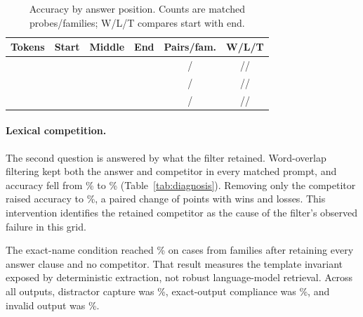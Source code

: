 \documentclass{article}
\begin{document}
\begin{table}[t]
\caption{Accuracy by answer position. Counts are matched probes/families; W/L/T compares start with end.}
\label{tab:position}
\centering
\small
\begin{tabular}{@{}lccccc@{}}
\toprule
Tokens & Start & Middle & End & Pairs/fam. & W/L/T \\
\midrule
\tierTwoTokens{} & \positionTwoStartAccuracy{} & \positionTwoMiddleAccuracy{} & \positionTwoEndAccuracy{}
& \positionTwoStartEndDenominator{}/\positionTwoStartEndFamilyCount{}
& \positionTwoStartEndWins{}/\positionTwoStartEndLosses{}/\positionTwoStartEndTies{} \\
\tierFourTokens{} & \positionFourStartAccuracy{} & \positionFourMiddleAccuracy{} & \positionFourEndAccuracy{}
& \positionFourStartEndDenominator{}/\positionFourStartEndFamilyCount{}
& \positionFourStartEndWins{}/\positionFourStartEndLosses{}/\positionFourStartEndTies{} \\
\tierEightTokens{} & \positionEightStartAccuracy{} & \positionEightMiddleAccuracy{} & \positionEightEndAccuracy{}
& \positionEightStartEndDenominator{}/\positionEightStartEndFamilyCount{}
& \positionEightStartEndWins{}/\positionEightStartEndLosses{}/\positionEightStartEndTies{} \\
\bottomrule
\end{tabular}
\end{table}

\paragraph{Lexical competition.}
The second question is answered by what the filter retained. Word-overlap filtering kept both the answer and competitor in every matched prompt, and accuracy fell from \pruningFullAccuracy{}\% to \pruningPrunedAccuracy{}\% (Table~\ref{tab:diagnosis}). Removing only the competitor raised accuracy to \pruningNoDecoyAccuracy{}\%, a paired change of \pruningNoDecoyChange{} points with \pruningNoDecoyWins{} wins and \pruningNoDecoyLosses{} losses. This intervention identifies the retained competitor as the cause of the filter's observed failure in this grid.

The exact-name condition reached \entitySelectorAccuracy{}\% on \entitySelectorCount{} cases from \entitySelectorFamilyCount{} families after retaining every answer clause and no competitor. That result measures the template invariant exposed by deterministic extraction, not robust language-model retrieval. Across all outputs, distractor capture was \distractorCaptureRate{}\%, exact-output compliance was \exactOutputComplianceRate{}\%, and invalid output was \invalidOutputRate{}\%.
\end{document}
